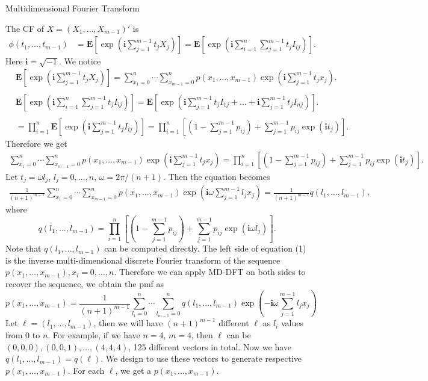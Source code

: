 \documentclass[12pt]{article}
\newcommand{\EE}{\mathbf{E}}
\newcommand{\ivec}{{\boldsymbol{i}}}
\begin{document}
Multidimensional Fourier Transform


The CF of $X=(X_1, \dots, X_{m-1})'$ is
\begin{align*}
\phi(t_1, \dots, t_{m-1}) & = \EE\left[\exp\left(\ivec\sum_{j=1}^{m-1}t_jX_j\right)\right]=\EE\left[\exp\left(\ivec\sum_{i = 1}^n \sum_{j=1}^{m-1}t_j I_{ij}\right)\right].
\end{align*}
Here $\ivec=\sqrt{-1}$. We notice\\
\begin{equation*}
\begin{split}
  &\EE\left[\exp\left(\ivec\sum_{j=1}^{m-1}t_jX_j\right)\right] = \sum_{x_1 = 0}^{n}\cdots \sum_{x_{m-1} = 0}^n p(x_1,\ldots,x_{m-1})\exp\left(\ivec\sum_{j=1}^{m-1}t_jx_j\right).\\
  \\
  &\EE\left[\exp\left(\ivec\sum_{i = 1}^n \sum_{j=1}^{m-1}t_j I_{ij}\right)\right] = \EE\left[ \exp\left( \ivec\sum_{j=1}^{m-1} t_jI_{1j} + \dots + \ivec\sum_{j=1}^{m-1} t_jI_{nj}\right)\right].\\
  \\
  & = \prod_{i=1}^n \EE\left[ \exp\left( \ivec \sum_{j=1}^{m-1} t_j I_{ij}\right)\right] = \prod_{i=1}^n \left[(1 - \sum_{j=1}^{m-1}p_{ij})+\sum_{j=1}^{m-1}p_{ij}\exp(\ivec t_j)\right].
\end{split}
\end{equation*}
Therefore we get
\begin{align*}
\sum_{x_1 = 0}^{n}\cdots \sum_{x_{m-1} = 0}^n p(x_1,\ldots,x_{m-1})\exp\left(\ivec\sum_{j=1}^{m-1}t_jx_j\right)= \prod_{i=1}^{n}\left[(1 - \sum_{j=1}^{m-1}p_{ij})+\sum_{j=1}^{m-1}p_{ij}\exp(\ivec t_j)\right].
\end{align*}
Let $t_j = \omega l_j$, $l_j = 0, \ldots, n$, $\omega = 2\pi/(n+1)$. Then the equation becomes
\begin{align}
\frac{1}{(n+1)^{m-1}} \sum_{x_1 = 0}^{n}\cdots \sum_{x_{m-1} = 0}^n p(x_1,\ldots,x_{m-1}) \exp\left(\ivec\omega\sum_{j=1}^{m-1}l_j x_j\right)= \frac{1}{(n+1)^{m-1}} q(l_1, \ldots, l_{m-1}),
\end{align}
where
$$ q(l_1, \ldots, l_{m-1})=\prod_{i=1}^{n}\left[(1 - \sum_{j=1}^{m-1}p_{ij})+\sum_{j=1}^{m-1}p_{ij}\exp(\ivec \omega l_j)\right].$$	
Note that $q(l_1, \ldots, l_{m-1})$ can be computed directly. The left side of equation (1) is the inverse multi-dimensional discrete Fourier transform of the sequence $ p(x_1,\ldots,x_{m-1}), x_i = 0 , \dots, n$. Therefore we can apply MD-DFT on both sides to recover the sequence, we obtain the pmf as
\begin{equation}
p(x_1, \ldots, x_{m-1}) = \frac{1}{(n+1)^{m-1}}\sum_{l_1 = 0}^{n}\cdots \sum_{l_{m-1} = 0}^n q(l_1, \ldots, l_{m-1}) \exp\left(-\ivec\omega\sum_{j=1}^{m-1}l_j x_j\right)
\end{equation}
Let $\ell = (l_1,\dots,l_{m-1})$, then we will have $(n
+1)^{m-1}$ different $\ell$ as $l_i$ values from $0$ to $n$. For example, if we have $n=4$, $m=4$, then $\ell$ can be $(0, 0, 0), (0, 0, 1), \dots, (4, 4, 4)$, 125 different vectors in total. Now we have $q(l_1,\dots,l_{m-1}) = q(\ell)$. We design to use these vectors to generate respective $p(x_1,\dots,x_{m-1})$. For each $\ell$, we get a $p(x_1,\dots,x_{m-1})$.
\end{document}
